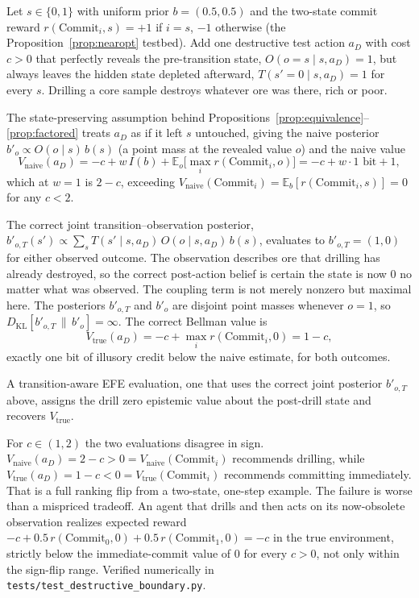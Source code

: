 \begin{example}
\label{ex:destructive}
Let $s \in \{0,1\}$ with uniform prior $b=(0.5,0.5)$ and the two-state commit reward $r(\mathrm{Commit}_i,s) = +1$ if $i=s$, $-1$ otherwise (the Proposition~\ref{prop:nearopt} testbed). Add one destructive test action $a_D$ with cost $c>0$ that perfectly reveals the pre-transition state, $O(o{=}s \mid s,a_D)=1$, but always leaves the hidden state depleted afterward, $T(s'{=}0 \mid s,a_D)=1$ for every $s$. Drilling a core sample destroys whatever ore was there, rich or poor.

The state-preserving assumption behind Propositions~\ref{prop:equivalence}--\ref{prop:factored} treats $a_D$ as if it left $s$ untouched, giving the naive posterior $b'_o \propto O(o\mid s)\,b(s)$ (a point mass at the revealed value $o$) and the naive value
\[
V_{\mathrm{naive}}(a_D) = -c + w\,I(b) + \mathbb{E}_o\big[\max_i r(\mathrm{Commit}_i,o)\big] = -c + w\cdot 1\text{ bit} + 1,
\]
which at $w{=}1$ is $2-c$, exceeding $V_{\mathrm{naive}}(\mathrm{Commit}_i)=\mathbb{E}_b[r(\mathrm{Commit}_i,s)]=0$ for any $c<2$.

The correct joint transition--observation posterior, $b'_{o,T}(s') \propto \sum_s T(s'\mid s,a_D)\,O(o\mid s,a_D)\,b(s)$, evaluates to $b'_{o,T}=(1,0)$ for either observed outcome. The observation describes ore that drilling has already destroyed, so the correct post-action belief is certain the state is now $0$ no matter what was observed. The coupling term is not merely nonzero but maximal here. The posteriors $b'_{o,T}$ and $b'_o$ are disjoint point masses whenever $o{=}1$, so $D_{\mathrm{KL}}[b'_{o,T}\,\|\,b'_o]=\infty$. The correct Bellman value is
\[
V_{\mathrm{true}}(a_D) = -c + \max_i r(\mathrm{Commit}_i,0) = 1-c,
\]
exactly one bit of illusory credit below the naive estimate, for both outcomes.

A transition-aware EFE evaluation, one that uses the correct joint posterior $b'_{o,T}$ above, assigns the drill zero epistemic value about the post-drill state and recovers $V_{\mathrm{true}}$.

For $c\in(1,2)$ the two evaluations disagree in sign. $V_{\mathrm{naive}}(a_D)=2-c>0=V_{\mathrm{naive}}(\mathrm{Commit}_i)$ recommends drilling, while $V_{\mathrm{true}}(a_D)=1-c<0=V_{\mathrm{true}}(\mathrm{Commit}_i)$ recommends committing immediately. That is a full ranking flip from a two-state, one-step example. The failure is worse than a mispriced tradeoff. An agent that drills and then acts on its now-obsolete observation realizes expected reward $-c + 0.5\,r(\mathrm{Commit}_0,0) + 0.5\,r(\mathrm{Commit}_1,0) = -c$ in the true environment, strictly below the immediate-commit value of $0$ for every $c>0$, not only within the sign-flip range. Verified numerically in \texttt{tests/\allowbreak test\_\allowbreak destructive\_\allowbreak boundary.py}.
\end{example}

